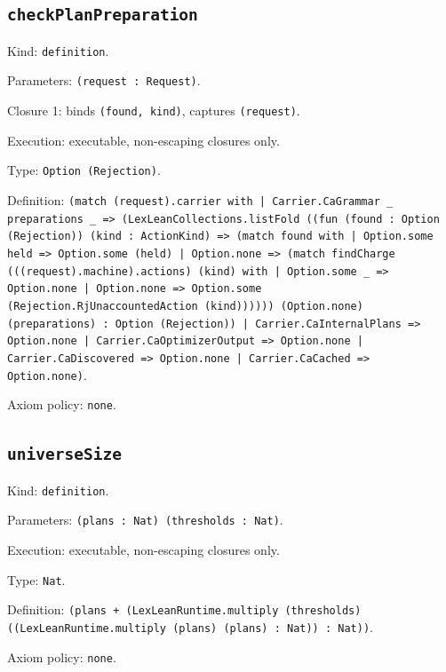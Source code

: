 \documentclass[11pt]{article}
\begin{document}
\subsection*{\texttt{checkPlanPreparation}}
\noindent Kind: \texttt{definition}.\par
\noindent Parameters: \texttt{(request : Request)}.\par
\noindent Closure 1: binds \texttt{(found, kind)}, captures \texttt{(request)}.\par
\noindent Execution: executable, non-escaping closures only.\par
\noindent Type: \texttt{Option (Rejection)}.\par
\noindent Definition: \texttt{(match (request).carrier with | Carrier.CaGrammar \_ preparations \_ => (LexLeanCollections.listFold ((fun (found : Option (Rejection)) (kind : ActionKind) => (match found with | Option.some held => Option.some (held) | Option.none => (match findCharge (((request).machine).actions) (kind) with | Option.some \_ => Option.none | Option.none => Option.some (Rejection.RjUnaccountedAction (kind)))))) (Option.none) (preparations) : Option (Rejection)) | Carrier.CaInternalPlans => Option.none | Carrier.CaOptimizerOutput => Option.none | Carrier.CaDiscovered => Option.none | Carrier.CaCached => Option.none)}.\par
\noindent Axiom policy: \texttt{none}.\par
\subsection*{\texttt{universeSize}}
\noindent Kind: \texttt{definition}.\par
\noindent Parameters: \texttt{(plans : Nat) (thresholds : Nat)}.\par
\noindent Execution: executable, non-escaping closures only.\par
\noindent Type: \texttt{Nat}.\par
\noindent Definition: \texttt{(plans + (LexLeanRuntime.multiply (thresholds) ((LexLeanRuntime.multiply (plans) (plans) : Nat)) : Nat))}.\par
\noindent Axiom policy: \texttt{none}.\par
\end{document}

